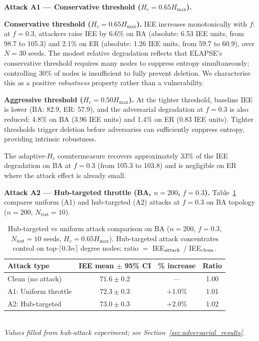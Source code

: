 \documentclass[review,12pt]{elsarticle}
\newcommand{\Hc}{H_c}
\newcommand{\Hmax}{H_{\max}}
\begin{document}
\textbf{Attack A1 --- Conservative threshold ($\Hc = 0.65\Hmax$).}

\textbf{Conservative threshold ($\Hc = 0.65\Hmax$).}
IEE increases monotonically with $f$: at $f=0.3$, attackers raise IEE by
6.6\% on BA (absolute: 6.53 IEE units, from 98.7 to 105.3) and 2.1\% on ER
(absolute: 1.26 IEE units, from 59.7 to 60.9), over $N=30$ seeds.
The modest relative degradation reflects that ELAPSE's conservative threshold
requires many nodes to suppress entropy simultaneously; controlling 30\% of
nodes is insufficient to fully prevent deletion. We characterise this as a
positive \emph{robustness} property rather than a vulnerability.

\textbf{Aggressive threshold ($\Hc = 0.50\Hmax$).}
At the tighter threshold, baseline IEE is lower (BA: 82.9, ER: 57.9),
and the adversarial degradation at $f=0.3$ is also reduced:
4.8\% on BA (3.96 IEE units) and 1.4\% on ER (0.83 IEE units).
Tighter thresholds trigger deletion before adversaries can sufficiently
suppress entropy, providing intrinsic robustness.

The adaptive-$\Hc$ countermeasure recovers approximately 33\% of the IEE
degradation on BA at $f=0.3$ (from 105.3 to 103.8) and is negligible on ER
where the attack effect is already small.

\textbf{Attack A2 --- Hub-targeted throttle (BA, $n=200$, $f=0.3$).}
Table~\ref{tab:hub_attack} compares uniform (A1) and hub-targeted (A2)
attacks at $f=0.3$ on BA topology ($n=200$, $N_{\mathrm{test}}=10$).

\begin{table}[htbp]
  \caption{Hub-targeted vs uniform attack comparison on BA ($n=200$, $f=0.3$,
           $N_{\mathrm{test}}=10$ seeds, $\Hc = 0.65\Hmax$).
           Hub-targeted attack concentrates control on top-$\lceil 0.3n\rceil$
           degree nodes; ratio $=$ IEE$_{\rm attack}$ / IEE$_{\rm clean}$.}
  \label{tab:hub_attack}
  \centering
  \small
  \renewcommand{\arraystretch}{1.15}
  \begin{tabular}{lccc}
    \toprule
    Attack type & IEE mean $\pm$ 95\% CI & \% increase & Ratio \\
    \midrule
    Clean (no attack)    & $71.6\pm 0.2$ & ---      & 1.00 \\
    A1: Uniform throttle & $72.3\pm 0.3$ & $+1.0\%$ & 1.01 \\
    A2: Hub-targeted     & $73.0\pm 0.3$ & $+2.0\%$ & 1.02 \\
    \bottomrule
  \end{tabular}
  \smallskip\\
  \small\textit{Values filled from hub-attack experiment; see Section~\ref{sec:adversarial_results}.}
\end{table}
\end{document}
